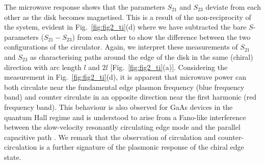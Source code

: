 The microwave response shows that  the parameters $S_{21}$ and $S_{23}$ deviate from each other as the disk becomes magnetised. This is a result of the non-reciprocity of the system, evident in Fig.~\ref{fig:fig2_ti}(d) where we have subtracted the bare $S$-parameters ($S_{21} - S_{23}$) from each other to show the difference between the two configurations of the circulator. Again, we interpret these measurements of $S_{21}$ and $S_{23}$ as characterising paths around the edge of the disk in the same (chiral) direction with arc length $l$ and $2l$ [Fig.~\ref{fig:fig2_ti}(a)]. Considering the measurement in Fig.~\ref{fig:fig2_ti}(d), it is apparent that microwave power can both circulate near the fundamental edge plasmon frequency (blue frequency band) and counter circulate in an opposite direction near the first harmonic (red frequency band). This behaviour is also observed for GaAs devices in the quantum Hall regime \cite{mahoney2016chip} and is understood to arise from a Fano-like interference between the slow-velocity resonantly circulating edge mode and the parallel capacitive path \cite{placke2016model}. We remark that the observation of circulation and counter-circulation is a further signature of the plasmonic response of the chiral edge state. 

